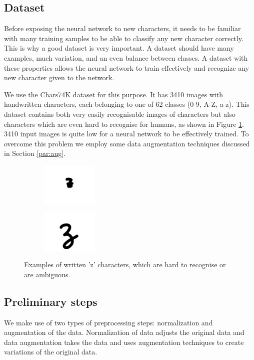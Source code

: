 \documentclass{article}
\begin{document}
\subsection{Dataset}
\label{sec:data}
Before exposing the neural network to new characters, it needs to be familiar with many training samples to be able to classify any new character correctly.
This is why a good dataset is very important. A dataset should have many examples, much variation, and an even balance between classes. A dataset with these properties
allows the neural network to train effectively and recognize any new character given to the network.

We use the Chars74K dataset for this purpose. It has 3410 images with handwritten characters, each belonging to one of 62 classes (0-9, A-Z, a-z).
This dataset contains both very easily recognisable images of characters but also characters which are even hard to recognise for humans, as shown in Figure \ref{fig:char}.
3410 input images is quite low for a neural network to be effectively trained. To overcome this problem we employ some data augmentation techniques discussed in Section \ref{par:aug}.

\begin{figure}
\begin{subfigure}{.23\textwidth}
  \centering
  \includegraphics[height=2cm]{images/bad_char1}
\end{subfigure}
\begin{subfigure}{.23\textwidth}
  \centering
  \includegraphics[height=2cm]{images/bad_char2}
\end{subfigure}
\caption{Examples of written 'z' characters, which are hard to recognise or are ambiguous.}
\label{fig:char}
\end{figure}


\subsection{Preliminary steps}
\label{sec:preproc}
We make use of two types of preprocessing steps: normalization and augmentation of the data. Normalization of data adjusts the original data and data augmentation takes the data and uses augmentation techniques to create variations of the original data.
\end{document}
